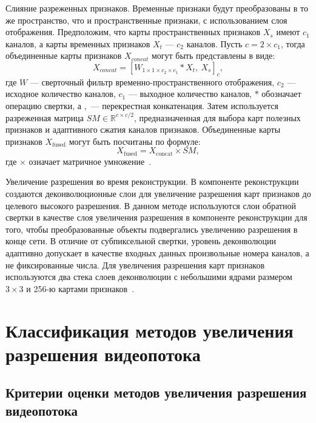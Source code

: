 \documentclass{bmstu}
\begin{document}
Слияние разреженных признаков. 
Временные признаки будут преобразованы в то же пространство, что и пространственные признаки, с использованием слоя отображения. 
Предположим, что карты пространственных признаков $X_s$ имеют $c_1$ каналов, а карты временных признаков $X_t$ --- $c_2$ каналов. 
Пусть $c = 2 \times c_1$, тогда объединенные карты признаков $X_{concat}$ могут быть представлены в виде:
\begin{equation}
X_{concat} = [W_{1 \times 1 \times c_2 \times c_1} * X_t,~X_s]_{c},
\end{equation}
где $W$ --- сверточный фильтр временно-пространственного отображения, $c_2$ --- исходное количество каналов, $c_1$ --- выходное количество каналов, $*$ обозначает операцию свертки, а $,$ --- перекрестная конкатенация. 
Затем используется разреженная матрица $SM \in \mathbb{R}^{c \times c/2}$, предназначенная для выбора карт полезных признаков и адаптивного сжатия каналов признаков. 
Объединенные карты признаков $X_{\text{fused}}$ могут быть посчитаны по формуле:
\begin{equation}
X_{\text{fused}} = X_{\text{concat}} \times SM,
\end{equation}
где $\times$ означает матричное умножение~\cite{Xiaobin2019}. 

Увеличение разрешения во время реконструкции. 
В компоненте реконструкции создаются деконволюционные слои для увеличение разрешения карт признаков до целевого высокого разрешения. 
В данном методе используются слои обратной свертки в качестве слоя увеличения разрешения в компоненте реконструкции для того, чтобы преобразованные объекты подвергались увеличению разрешения в конце сети. 
В отличие от субпиксельной свертки, уровень деконволюции адаптивно допускает в качестве входных данных произвольные номера каналов, а не фиксированные числа. 
Для увеличения разрешения карт признаков используются два стека слоев деконволюции с небольшими ядрами размером $3 \times 3$ и 256-ю картами признаков~\cite{Xiaobin2019}.

\chapter{Классификация методов увеличения разрешения видеопотока}

\section{Критерии оценки методов увеличения разрешения видеопотока}
\end{document}
